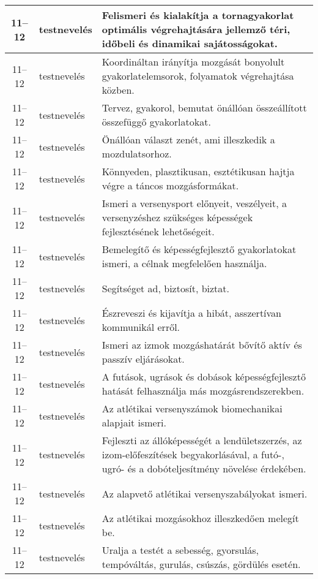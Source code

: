 \begin{small}
\begin{longtable}{c | p{2cm} |  p{11cm} }
              11--12 & testnevelés & Felismeri és kialakítja a tornagyakorlat optimális végrehajtására jellemző téri, időbeli és dinamikai sajátosságokat. \\ \hline
              11--12 & testnevelés & Koordináltan irányítja mozgását bonyolult gyakorlatelemsorok, folyamatok végrehajtása közben. \\ \hline
              11--12 & testnevelés & Tervez, gyakorol, bemutat önállóan összeállított összefüggő gyakorlatokat. \\ \hline
              11--12 & testnevelés & Önállóan választ zenét, ami illeszkedik a mozdulatsorhoz. \\ \hline
              11--12 & testnevelés & Könnyeden, plasztikusan, esztétikusan hajtja végre a táncos mozgásformákat. \\ \hline
              11--12 & testnevelés & Ismeri a versenysport előnyeit, veszélyeit, a versenyzéshez szükséges képességek fejlesztésének lehetőségeit. \\ \hline
              11--12 & testnevelés & Bemelegítő és képességfejlesztő gyakorlatokat ismeri, a célnak megfelelően használja. \\ \hline
              11--12 & testnevelés & Segítséget ad, biztosít, biztat. \\ \hline
              11--12 & testnevelés & Észreveszi és kijavítja a hibát, asszertívan kommunikál erről. \\ \hline
              11--12 & testnevelés & Ismeri az izmok mozgáshatárát bővítő aktív és passzív eljárásokat. \\ \hline
              11--12 & testnevelés & A futások, ugrások és dobások képességfejlesztő hatását felhasználja más mozgásrendszerekben. \\ \hline
              11--12 & testnevelés & Az atlétikai versenyszámok biomechanikai alapjait ismeri. \\ \hline
              11--12 & testnevelés & Fejleszti az állóképességét a lendületszerzés, az izom-előfeszítések begyakorlásával, a futó-, ugró- és a dobóteljesítmény növelése érdekében. \\ \hline
              11--12 & testnevelés & Az alapvető atlétikai versenyszabályokat ismeri. \\ \hline
              11--12 & testnevelés & Az atlétikai mozgásokhoz illeszkedően melegít be. \\ \hline
              11--12 & testnevelés & Uralja a testét a sebesség, gyorsulás, tempóváltás, gurulás, csúszás, gördülés esetén. \\ \hline

\end{longtable}
\end{small}
